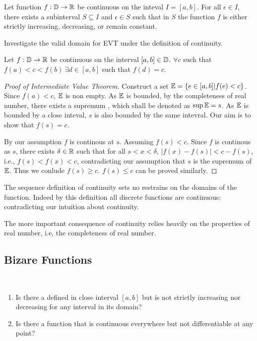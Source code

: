 \documentclass[../note.tex]{subfiles}
\begin{document}
\begin{corollary}
	Let function $f: \mathbb{D} \rightarrow	\mathbb{R}$ be continuous on the inteval $I=[a,b]$. For all $\epsilon \in I$, there exists a subinterval $S\subseteq I$ and $\epsilon \in S$ such that in $S$ the function $f$ is either strictly increasing, decreasing, or remain constant.
\end{corollary}

\begin{hypothesis}
	Investigate the valid domain for EVT under the definition of continuity. 
\end{hypothesis}

\begin{theorem}
	Let $f: \mathbb{D} \rightarrow \mathbb{R}$ be continuous on the interval $[a,b]\in \mathbb{D}$. $\forall c $ such that $f(a)<c<f(b)\ \exists d \in [a,b] $ such that $ f(d) = c$.  
\end{theorem}

\begin{proof}[Proof of Intermediate Value Theorem]
	Construct a set $\mathbb{E} = \{e\in [a,b]| f(e)<c\}$. Since $f(a)<c$, $\mathbb{E}$ is non empty.  
	As $\mathbb{E}$ is bounded, by the completeness of real number, there exists a supremum , which shall be denoted as $\sup{\mathbb{E}}=s$. 
	As $\mathbb{E}$ is bounded by a close inteval, $s$ is also bounded by the same intevral. Our aim is to show that $f(s)=c$.

	By our assumption $f$ is continous at $s$. Assuming $f(s) < c$. 
	Since $f$ is continous as $s$, there exists $\delta \in \mathbb{R}$ such that for all $s<x<\delta$, $|f(x)-f(s)|<c-f(s)$, i.e., $f(s)<f(x)<c$, contradicting our assumption that $s$ is the supremum of $\mathbb{E}$. 
	Thus we conlude $f(s)\geq c$. $f(s)\leq c$ can be proved similarly.
\end{proof}

\begin{remark}
	The sequence definition of continuity sets no restrains on the domains of the function. Indeed by this definition all discrete functions are continuous: contradicting our intuition about continuity.
	
	The more important consequence of continuity relies heavily on the properties of real number, i.e, the completeness of real number.
\end{remark}

\subsection{Bizare Functions}
\begin{hypothesis}
	\ 
\begin{enumerate}
	\item Is there a defined in close interval $[a,b]$ but is not strictly increasing nor decreasing for any interval in its domain? 
	\item Is there a function that is continuous everywhere but not differentiable at any point?
\end{enumerate}
\end{hypothesis}
\end{document}

